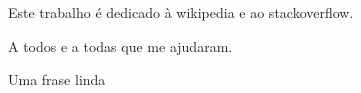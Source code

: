 \begin{dedicatoria}
  Este trabalho é dedicado à wikipedia e ao stackoverflow. 
\end{dedicatoria}

\begin{agradecimentos}
  A todos e a todas que me ajudaram.
\end{agradecimentos}

\begin{epigrafe}
  Uma frase linda\\
\end{epigrafe}